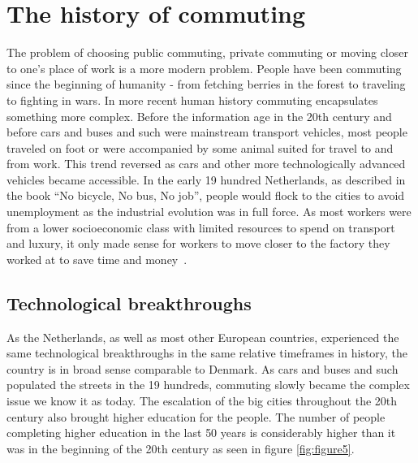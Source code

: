 \section{The history of commuting}\label{sec:the-history-of-commuting}

The problem of choosing public commuting, private commuting or moving closer to one's place of work is a more modern
problem.
People have been commuting since the beginning of humanity - from fetching berries in the forest to traveling to
fighting in wars.
In more recent human history commuting encapsulates something more complex.
Before the information age in the 20th century and before cars and buses and such were mainstream transport vehicles,
most people traveled on foot or were accompanied by some animal suited for travel to and from work.
This trend reversed as cars and other more technologically advanced vehicles became accessible.
In the early 19 hundred Netherlands, as described in the book ``No bicycle, No bus, No job'', people would flock to the
cities to avoid unemployment as the industrial evolution was in full force.
As most workers were from a lower socioeconomic class with limited resources to spend on transport and luxury, it only
made sense for workers to move closer to the factory they worked at to save time and money~\cite{bek2022}.

\subsection{Technological breakthroughs}\label{subsec:technological-breakthroughs}

As the Netherlands, as well as most other European countries, experienced the same technological breakthroughs in the
same relative timeframes in history, the country is in broad sense comparable to Denmark.
As cars and buses and such populated the streets in the 19 hundreds, commuting slowly became the complex issue we
know it as today.
The escalation of the big cities throughout the 20th century also brought higher education for the people.
The number of people completing higher education in the last 50 years is considerably higher than it was in the
beginning of the 20th century as seen in figure \ref{fig:figure5}.

